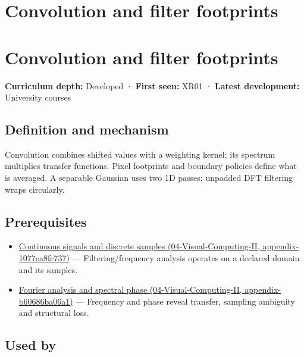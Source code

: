 \hypertarget{appendix-d5b3c692d9f0}{}
\section*{Convolution and filter footprints}
\section{Convolution and filter footprints}\label{convolution-and-filter-footprints}

\textbf{Curriculum depth:} Developed · \textbf{First seen:} XR01 · \textbf{Latest development:} University courses

\subsection{Definition and mechanism}\label{definition-and-mechanism}

Convolution combines shifted values with a weighting kernel; its spectrum multiplies transfer functions. Pixel footprints and boundary policies define what is averaged. A separable Gaussian uses two 1D passes; unpadded DFT filtering wraps circularly.

\subsection{Prerequisites}\label{prerequisites}

\begin{itemize}
\tightlist
\item
  \href{}{Continuous signals and discrete samples (04-Visual-Computing-II, appendix-1077ea8fc737)} --- Filtering/frequency analysis operates on a declared domain and its samples.
\item
  \href{}{Fourier analysis and spectral phase (04-Visual-Computing-II, appendix-b60686ba06a1)} --- Frequency and phase reveal transfer, sampling ambiguity and structural loss.
\end{itemize}

\subsection{Used by}\label{used-by}


